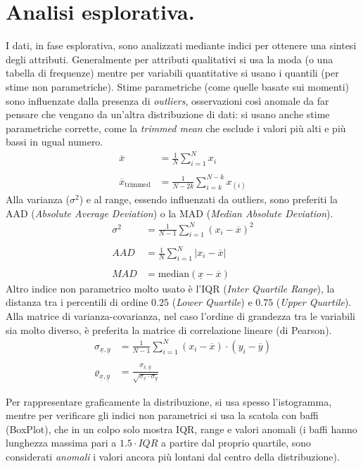 \documentclass[11pt, a4page, twocolumn]{article}
\begin{document}
\section{Analisi esplorativa.}
I dati, in fase esplorativa, sono analizzati mediante indici per ottenere una sintesi degli attributi.
Generalmente per attributi qualitativi si usa la moda (o una tabella di frequenze) mentre per variabili quantitative si usano i quantili (per stime non parametriche).
Stime parametriche (come quelle basate sui momenti) sono influenzate dalla presenza di \textit{outliers}, osservazioni così anomale da far pensare che vengano da un'altra distribuzione di dati: si usano anche stime parametriche corrette, come la \textit{trimmed mean} che esclude i valori più alti e più bassi in ugual numero.
\begin{align*}
  \overline{x} &= \frac{1}{N}\sum^N_{i=1}{x_i} \\ \\
  \overline{x}_\text{trimmed} &= \frac{1}{N-2k}\sum^{N-k}_{i=k}{x_{(i)}}
\end{align*}
Alla varianza ($\sigma^2$) e al range, essendo influenzati da outliers, sono preferiti la AAD (\textit{Absolute Average Deviation}) o la MAD (\textit{Median Absolute Deviation}).
\begin{align*}
  \sigma^2 &= \frac{1}{N-1}\sum^N_{i=1}{(x_i - \overline{x})^2} \\ \\
  AAD &= \frac{1}{N}\sum^N_{i=1}{| x_i - \overline{x} |} \\ \\
  MAD &= \text{median}(\underline{x} - \overline{x})
\end{align*}
Altro indice non parametrico molto usato è l'IQR (\textit{Inter Quartile Range}), la distanza tra i percentili di ordine $0.25$ (\textit{Lower Quartile}) e $0.75$ (\textit{Upper Quartile}).
Alla matrice di varianza-covarianza, nel caso l'ordine di grandezza tra le variabili sia molto diverso, è preferita la matrice di correlazione lineare (di Pearson).
\begin{align*}
  \sigma_{\underline{x}, \underline{y}} &= \frac{1}{N-1}\sum^N_{i=1}{(x_i - \overline{x}) \cdot (y_i - \overline{y})} \\ \\
  \varrho_{\underline{x}, \underline{y}} &= \frac{\sigma_{\underline{x}, \underline{y}}}{\sqrt{\sigma_{\underline{x}} \cdot \sigma_{\underline{y}}}}
\end{align*}

Per rappresentare graficamente la distribuzione, si usa spesso l'istogramma, mentre per verificare gli indici non parametrici si usa la scatola con baffi (BoxPlot), che in un colpo solo mostra IQR, range e valori anomali (i baffi hanno lunghezza massima pari a $1.5 \cdot IQR$ a partire dal proprio quartile, sono considerati \textit{anomali} i valori ancora più lontani dal centro della distribuzione).
\end{document}
